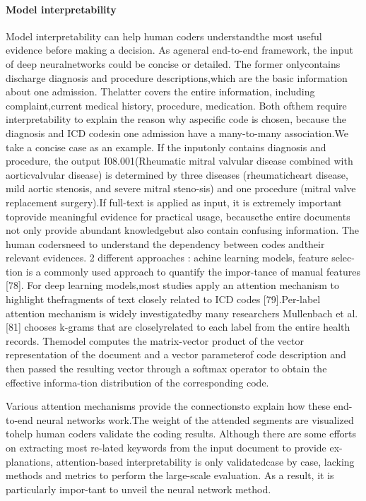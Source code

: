 \paragraph{Model interpretability}
Model  interpretability  can  help  human  coders  understandthe  most  useful  evidence  before  making  a  decision.  As  ageneral  end-to-end  framework,  the  input  of  deep  neuralnetworks  could  be  concise  or  detailed.  The  former  onlycontains  discharge  diagnosis  and  procedure  descriptions,which are the basic information about one admission. Thelatter  covers  the  entire  information,  including  complaint,current  medical  history,  procedure,  medication.  Both  ofthem  require  interpretability  to  explain  the  reason  why  aspecific code is chosen, because the diagnosis and ICD codesin one admission have a many-to-many association.We  take  a  concise  case  as  an  example.  If  the  inputonly  contains  diagnosis  and  procedure,  the  output  I08.001(Rheumatic  mitral  valvular  disease  combined  with  aorticvalvular disease) is determined by three diseases (rheumaticheart disease, mild aortic stenosis, and severe mitral steno-sis) and one procedure (mitral valve replacement surgery).If full-text is applied as input, it is extremely important toprovide  meaningful  evidence  for  practical  usage,  becausethe entire documents not only provide abundant knowledgebut also contain confusing information. The human codersneed  to  understand  the  dependency  between  codes  andtheir relevant evidences.
2 different approaches : 
achine learning models, feature selec-tion  is  a  commonly  used  approach  to  quantify  the  impor-tance  of  manual  features  [78].  For  deep  learning  models,most studies apply an attention mechanism to highlight thefragments of text closely related to ICD codes [79].Per-label  attention  mechanism  is  widely  investigatedby  many  researchers Mullenbach  et  al.  [81]  chooses  k-grams  that  are  closelyrelated  to  each  label  from  the  entire  health  records.  Themodel  computes  the  matrix-vector  product  of  the  vector representation  of  the  document  and  a  vector  parameterof  code  description  and  then  passed  the  resulting  vector through a softmax operator to obtain the effective informa-tion distribution of the corresponding code. 

Various  attention  mechanisms  provide  the  connectionsto  explain  how  these  end-to-end  neural  networks  work.The  weight  of  the  attended  segments  are  visualized  tohelp  human  coders  validate  the  coding  results.
Although  there  are  some  efforts  on  extracting  most  re-lated  keywords  from  the  input  document  to  provide  ex-planations, attention-based interpretability is only validatedcase  by  case,  lacking  methods  and  metrics  to  perform  the large-scale evaluation. As a result, it is particularly impor-tant to unveil the neural network method.


